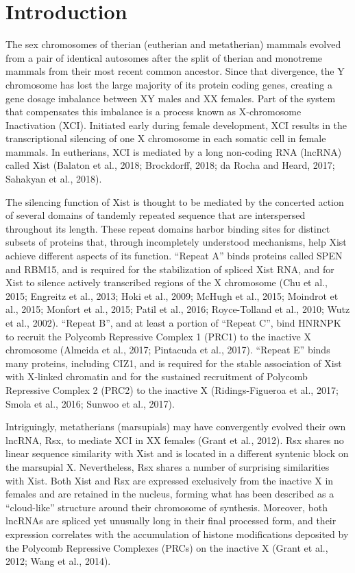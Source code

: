 \section{Introduction}
The sex chromosomes of therian (eutherian and metatherian) mammals evolved from a pair of identical autosomes after the split of therian and monotreme mammals from their most recent common ancestor. Since that divergence, the Y chromosome has lost the large majority of its protein coding genes, creating a gene dosage imbalance between XY males and XX females. Part of the system that compensates this imbalance is a process known as X-chromosome Inactivation (XCI). Initiated early during female development, XCI results in the transcriptional silencing of one X chromosome in each somatic cell in female mammals. In eutherians, XCI is mediated by a long non-coding RNA (lncRNA) called Xist (Balaton et al., 2018; Brockdorff, 2018; da Rocha and Heard, 2017; Sahakyan et al., 2018). 

The silencing function of Xist is thought to be mediated by the concerted action of several domains of tandemly repeated sequence that are interspersed throughout its length. These repeat domains harbor binding sites for distinct subsets of proteins that, through incompletely understood mechanisms, help Xist achieve different aspects of its function. “Repeat A” binds proteins called SPEN and RBM15, and is required for the stabilization of spliced Xist RNA, and for Xist to silence actively transcribed regions of the X chromosome (Chu et al., 2015; Engreitz et al., 2013; Hoki et al., 2009; McHugh et al., 2015; Moindrot et al., 2015; Monfort et al., 2015; Patil et al., 2016; Royce-Tolland et al., 2010; Wutz et al., 2002). “Repeat B”, and at least a portion of “Repeat C”, bind HNRNPK to recruit the Polycomb Repressive Complex 1 (PRC1) to the inactive X chromosome (Almeida et al., 2017; Pintacuda et al., 2017). “Repeat E” binds many proteins, including CIZ1, and is required for the stable association of Xist with X-linked chromatin and for the sustained recruitment of Polycomb Repressive Complex 2 (PRC2) to the inactive X (Ridings-Figueroa et al., 2017; Smola et al., 2016; Sunwoo et al., 2017).

Intriguingly, metatherians (marsupials) may have convergently evolved their own lncRNA, Rsx, to mediate XCI in XX females (Grant et al., 2012). Rsx shares no linear sequence similarity with Xist and is located in a different syntenic block on the marsupial X. Nevertheless, Rsx shares a number of surprising similarities with Xist. Both Xist and Rsx are expressed exclusively from the inactive X in females and are retained in the nucleus, forming what has been described as a “cloud-like” structure around their chromosome of synthesis. Moreover, both lncRNAs are spliced yet unusually long in their final processed form, and their expression correlates with the accumulation of histone modifications deposited by the Polycomb Repressive Complexes (PRCs) on the inactive X (Grant et al., 2012; Wang et al., 2014). 

